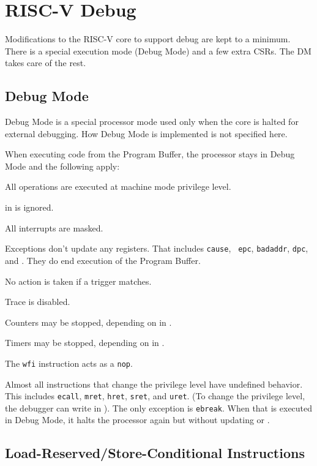 \chapter{RISC-V Debug}
\label{sec:core_debug}

Modifications to the RISC-V core to support debug are kept to a minimum.  There
is a special execution mode (Debug Mode) and a few extra CSRs. The DM takes care
of the rest.

\section{Debug Mode} \label{debugmode}

Debug Mode is a special processor mode used only when the core is halted for
external debugging. How Debug Mode is implemented is not specified here.

\begin{steps}{When executing code from the Program Buffer, the processor stays
    in Debug Mode and the following apply:}
\item All operations are executed at machine mode privilege level.
\item \Fmprv in \Rmstatus is ignored.
\item All interrupts are masked.
\item Exceptions don't update any registers.  That includes {\tt cause}, {\tt
    epc}, {\tt badaddr}, {\tt dpc}, and \Rmstatus. They do end execution of the
    Program Buffer.
\item No action is taken if a trigger matches.
\item Trace is disabled.
\item Counters may be stopped, depending on \Fstopcount in \Rdcsr.
\item Timers may be stopped, depending on \Fstoptime in \Rdcsr.
\item The {\tt wfi} instruction acts as a {\tt nop}.
\item Almost all instructions that change the privilege level have undefined
    behavior.  This includes {\tt ecall}, {\tt mret}, {\tt hret}, {\tt sret},
    and {\tt uret}.  (To change the privilege level, the debugger can write
    \Fprv in \Rdcsr). The only exception is {\tt ebreak}. When that is executed
    in Debug Mode, it halts the processor again but without updating \Rdpc or \Rdcsr.
\end{steps}

\section{Load-Reserved/Store-Conditional Instructions}

